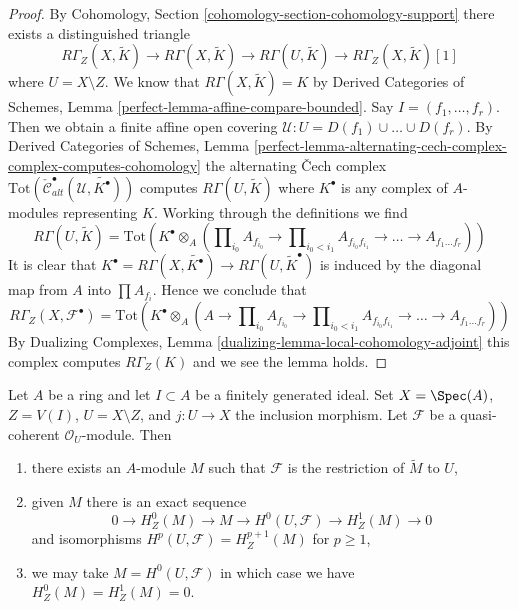 \begin{proof}
By Cohomology, Section \ref{cohomology-section-cohomology-support}
there exists a distinguished triangle
$$
R\Gamma_Z(X, \widetilde{K})
\to R\Gamma(X, \widetilde{K})
\to R\Gamma(U, \widetilde{K})
\to R\Gamma_Z(X, \widetilde{K})[1]
$$
where $U = X \setminus Z$. We know that $R\Gamma(X, \widetilde{K}) = K$
by Derived Categories of Schemes, Lemma
\ref{perfect-lemma-affine-compare-bounded}.
Say $I = (f_1, \ldots, f_r)$. Then we obtain a finite affine
open covering $\mathcal{U} : U = D(f_1) \cup \ldots \cup D(f_r)$.
By Derived Categories of Schemes, Lemma
\ref{perfect-lemma-alternating-cech-complex-complex-computes-cohomology}
the alternating {\v C}ech complex
$\text{Tot}(\check{\mathcal{C}}_{alt}^\bullet(\mathcal{U},
\widetilde{K^\bullet}))$
computes $R\Gamma(U, \widetilde{K})$ where $K^\bullet$ is any
complex of $A$-modules representing $K$. Working through the
definitions we find
$$
R\Gamma(U, \widetilde{K}) =
\text{Tot}\left(
K^\bullet \otimes_A
(\prod\nolimits_{i_0} A_{f_{i_0}} \to
\prod\nolimits_{i_0 < i_1} A_{f_{i_0}f_{i_1}} \to
\ldots \to A_{f_1\ldots f_r})\right)
$$
It is clear that
$K^\bullet = R\Gamma(X, \widetilde{K^\bullet}) \to
R\Gamma(U, \widetilde{K}^\bullet)$
is induced by the diagonal map from $A$ into $\prod A_{f_i}$.
Hence we conclude that
$$
R\Gamma_Z(X, \mathcal{F}^\bullet) =
\text{Tot}\left(
K^\bullet \otimes_A
(A \to \prod\nolimits_{i_0} A_{f_{i_0}} \to
\prod\nolimits_{i_0 < i_1} A_{f_{i_0}f_{i_1}} \to
\ldots \to A_{f_1\ldots f_r})\right)
$$
By Dualizing Complexes, Lemma \ref{dualizing-lemma-local-cohomology-adjoint}
this complex computes $R\Gamma_Z(K)$ and we see the lemma holds.
\end{proof}

\begin{lemma}
\label{lemma-local-cohomology}
Let $A$ be a ring and let $I \subset A$ be a finitely generated ideal.
Set $X = \Spec(A)$, $Z = V(I)$, $U = X \setminus Z$, and $j : U \to X$
the inclusion morphism. Let $\mathcal{F}$ be a quasi-coherent
$\mathcal{O}_U$-module. Then
\begin{enumerate}
\item there exists an $A$-module $M$ such that $\mathcal{F}$ is the
restriction of $\widetilde{M}$ to $U$,
\item given $M$ there is an exact sequence
$$
0 \to H^0_Z(M) \to M \to H^0(U, \mathcal{F}) \to H^1_Z(M) \to 0
$$
and isomorphisms $H^p(U, \mathcal{F}) = H^{p + 1}_Z(M)$ for $p \geq 1$,
\item we may take $M = H^0(U, \mathcal{F})$ in which case
we have $H^0_Z(M) = H^1_Z(M) = 0$.
\end{enumerate}
\end{lemma}

